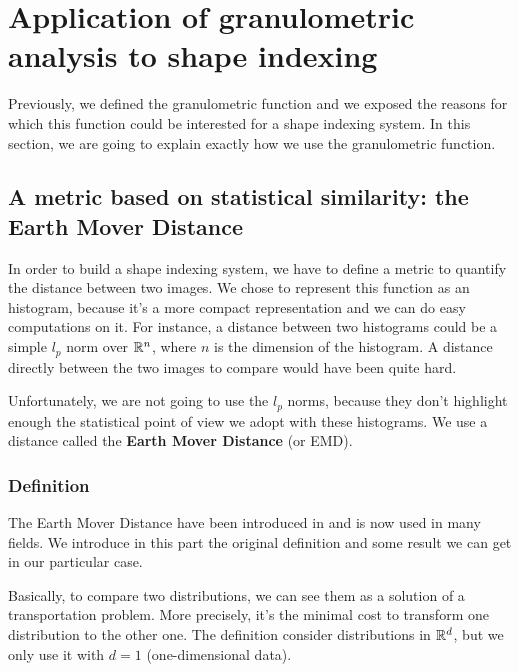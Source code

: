 \section{Application of granulometric analysis to shape indexing}

Previously, we defined the granulometric function and we exposed the reasons for which this function could be interested for a shape indexing system. In this section, we are going to explain exactly how we use the granulometric function.

\subsection{A metric based on statistical similarity: the Earth Mover Distance}

In order to build a shape indexing system, we have to define a metric to quantify the distance between two images. We chose to represent this function as an histogram, because it's a more compact representation and we can do easy computations on it. For instance, a distance between two histograms could be a simple $l_p$ norm over $\mathbb{R}^n$, where $n$ is the dimension of the histogram. A distance directly between the two images to compare would have been quite hard.

Unfortunately, we are not going to use the $l_p$ norms, because they don't highlight enough the statistical point of view we adopt with these histograms. We use a distance called the \textbf{Earth Mover Distance} (or EMD).

\subsubsection{Definition}

The Earth Mover Distance have been introduced in \cite{EMD-def} and is now used in many fields. We introduce in this part the original definition and some result we can get in our particular case.

Basically, to compare two distributions, we can see them as a solution of a transportation problem. More precisely, it's the minimal cost to transform one distribution to the other one. The definition consider distributions in $\mathbb{R}^d$, but we only use it with $d=1$ (one-dimensional data).

